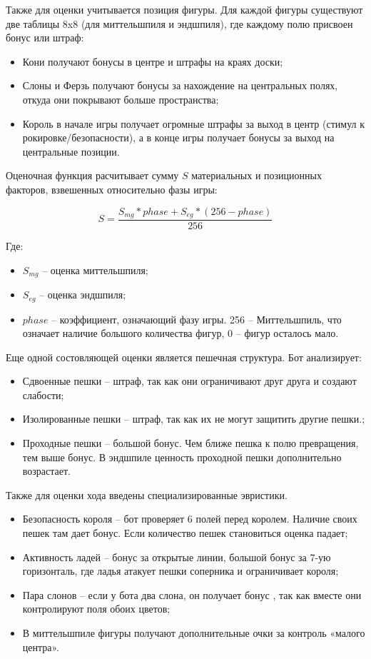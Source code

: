 \documentclass[a4paper,14pt]{extarticle}
\begin{document}
Также для оценки учитывается позиция фигуры. Для каждой фигуры существуют две таблицы 8x8 (для миттельшпиля и эндшпиля), где каждому полю присвоен бонус или штраф:
\begin{itemize}
    \item[--] Кони получают бонусы в центре и штрафы на краях доски;
    \item[--] Слоны и Ферзь получают бонусы за нахождение на центральных полях, откуда они покрывают больше пространства;
    \item[--] Король в начале игры получает огромные штрафы за выход в центр (стимул к рокировке/безопасности), а в конце игры получает бонусы за выход на центральные позиции.
\end{itemize}

Оценочная функция расчитывает сумму $S$ материальных и позиционных факторов, взвешенных относительно фазы игры:

$$S = \frac{S_{mg} * phase + S_{eg} * (256 - phase)}{256}$$

Где:
\begin{itemize}
    \item[--] $S_{mg}$ -- оценка миттельшпиля;
    \item[--] $S_{eg}$ -- оценка эндшпиля;
    \item[--] $phase$ -- коэффициент, означающий фазу игры. 256 -- Миттельшпиль, что означает наличие большого количества фигур, 0 -- фигур осталось мало.
\end{itemize}

Еще одной состовляющей оценки является пешечная структура. Бот анализирует:
\begin{itemize}
    \item[--] Сдвоенные пешки -- штраф, так как они ограничивают друг друга и создают слабости;
    \item[--] Изолированные пешки -- штраф, так как их не могут защитить другие пешки.;
    \item[--] Проходные пешки -- большой бонус. Чем ближе пешка к полю превращения, тем выше бонус. В эндшпиле ценность проходной пешки дополнительно возрастает.
\end{itemize}

Также для оценки хода введены специализированные эвристики.
\begin{itemize}
    \item[--] Безопасность короля -- бот проверяет 6 полей перед королем. Наличие своих пешек там дает бонус. Если количество пешек становиться оценка падает;
    \item[--] Активность ладей -- бонус за открытые линии, большой бонус за 7-ую горизонталь, где ладья атакует пешки соперника и ограничивает короля;
    \item[--] Пара слонов -- если у бота два слона, он получает бонус , так как вместе они контролируют поля обоих цветов;
    \item[--] В миттельшпиле фигуры получают дополнительные очки за контроль «малого центра».
\end{itemize}
\end{document}
